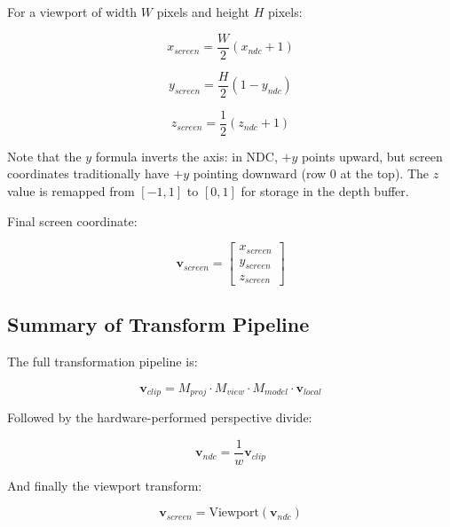 \documentclass[11pt]{article}
\begin{document}
For a viewport of width $W$ pixels and height $H$ pixels:

\begin{equation}
    x_{screen} = \frac{W}{2} (x_{ndc} + 1)
\end{equation}

\begin{equation}
    y_{screen} = \frac{H}{2} (1 - y_{ndc})
\end{equation}

\begin{equation}
    z_{screen} = \frac{1}{2}(z_{ndc} + 1)
\end{equation}

Note that the $y$ formula inverts the axis: in NDC, $+y$ points upward, but screen coordinates traditionally have $+y$ pointing downward (row 0 at the top). The $z$ value is remapped from $[-1, 1]$ to $[0, 1]$ for storage in the depth buffer.

Final screen coordinate:

\begin{equation}
    \mathbf{v}_{screen} =
    \begin{bmatrix}
        x_{screen} \\
        y_{screen} \\
        z_{screen}
    \end{bmatrix}
\end{equation}


\subsection{Summary of Transform Pipeline}

The full transformation pipeline is:

\begin{equation}
    \mathbf{v}_{clip} =
    M_{proj} \cdot
    M_{view} \cdot
    M_{model} \cdot
    \mathbf{v}_{local}
\end{equation}

Followed by the hardware-performed perspective divide:

\begin{equation}
    \mathbf{v}_{ndc} = \frac{1}{w} \mathbf{v}_{clip}
\end{equation}

And finally the viewport transform:

\begin{equation}
    \mathbf{v}_{screen} = \text{Viewport}(\mathbf{v}_{ndc})
\end{equation}
\end{document}
